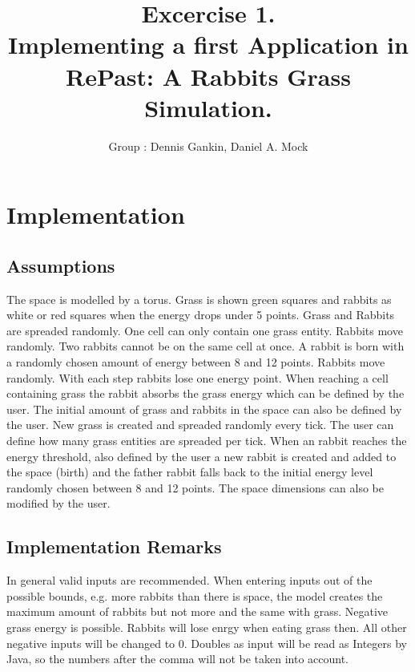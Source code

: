 \documentclass[11pt]{article}
\title{\bf Excercise 1.\\ Implementing a first Application in RePast: A Rabbits Grass Simulation.}
\author{Group \textnumero 29: Dennis Gankin, Daniel A. Mock}
\begin{document}
\maketitle

\section{Implementation}

\subsection{Assumptions}
The space is modelled by a torus. Grass is shown green squares and rabbits as white or red squares when the energy drops under 5 points. 
Grass and Rabbits are spreaded randomly. One cell can only contain one grass entity. Rabbits move randomly. Two rabbits cannot be on the same cell at once. A rabbit is born with a randomly chosen amount of energy between 8 and 12 points. Rabbits move randomly. With each step rabbits lose one energy point. When reaching a cell containing grass the rabbit absorbs the grass energy which can be defined by the user. The initial amount of grass and rabbits in the space can also be defined by the user. New grass is created and spreaded randomly every tick. The user can define how many grass entities are spreaded per tick. When an rabbit reaches the energy threshold, also defined by the user a new rabbit is created and added to the space (birth) and the father rabbit falls back to the initial energy level randomly chosen between 8 and 12 points. The space dimensions can also be modified by the user.


\subsection{Implementation Remarks}
In general valid inputs are recommended. When entering inputs out of the possible bounds, e.g. more rabbits than there is space, the model creates the maximum amount of rabbits but not more and the same with grass. Negative grass energy is possible. Rabbits will lose enrgy when eating grass then. All other negative inputs will be changed to 0. Doubles as input will be read as Integers by Java, so the numbers after the comma will not be taken into account. 
\end{document}
